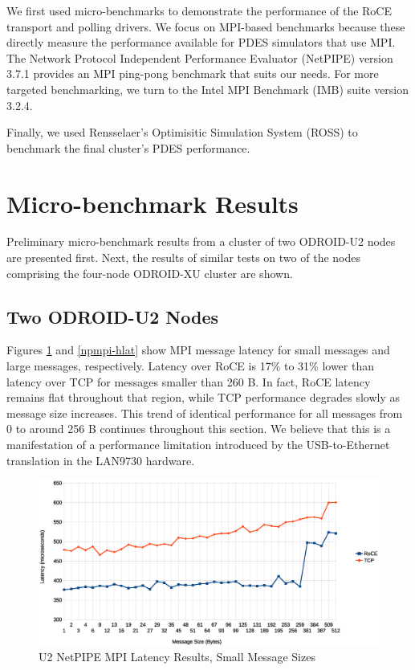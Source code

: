\documentclass[11pt]{book}
\begin{document}
We first used micro-benchmarks to demonstrate the performance of the RoCE
transport and polling drivers. We focus on MPI-based benchmarks because these
directly measure the performance available for PDES simulators that use MPI. The
Network Protocol Independent Performance Evaluator (NetPIPE) \cite{NetPIPE}
version 3.7.1 provides an MPI ping-pong benchmark that suits our needs. For more
targeted benchmarking, we turn to the Intel MPI Benchmark (IMB) suite version
3.2.4.

Finally, we used Rensselaer's Optimisitic Simulation System (ROSS) to benchmark
the final cluster's PDES performance.

\section{\textbf{Micro-benchmark Results}}

Preliminary micro-benchmark results from a cluster of two ODROID-U2 nodes are
presented first. Next, the results of similar tests on two of the nodes
comprising the four-node ODROID-XU cluster are shown.

\subsection{\textbf{Two ODROID-U2 Nodes}}

Figures \ref{npmpi-llat} and \ref{npmpi-hlat} show MPI message latency for small
messages and large messages, respectively. Latency over RoCE is 17\% to 31\%
lower than latency over TCP for messages smaller than 260 B. In fact, RoCE
latency remains flat throughout that region, while TCP performance degrades
slowly as message size increases. This trend of identical performance for all
messages from 0 to around 256 B continues throughout this section. We believe
that this is a manifestation of a performance limitation introduced by the
USB-to-Ethernet translation in the LAN9730 hardware.

\begin{figure}[h]
\includegraphics[width=\textwidth]{netpipe_lat_small}
\caption{U2 NetPIPE MPI Latency Results, Small Message Sizes}
\label{npmpi-llat}
\end{figure}
\end{document}

